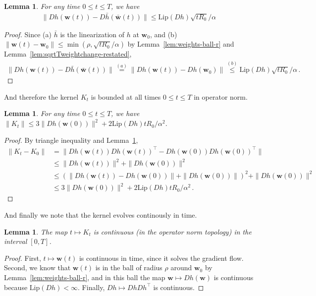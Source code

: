 \documentclass[11pt]{article} %
\newcommand{\<}{\langle}
\renewcommand{\>}{\rangle}
\def\bw{{\boldsymbol w}}
\def\barbw{\bar{\bw}}
\newcommand{\Lip}{\mathrm{Lip}}
\theoremstyle{plain}
\newtheorem{lemma}[theorem]{Lemma}
\theoremstyle{definition}
\theoremstyle{remark}
\begin{document}
\begin{lemma}\label{lem:Dhclose}
For any time $0 \leq t \leq T$, we have
\begin{align*}
\|Dh(\bw(t)) - D\bar{h}(\barbw(t))\| \leq \Lip(Dh) \sqrt{t R_0} / \alpha
\end{align*}
\end{lemma}
\begin{proof}
Since (a) $\bar{h}$ is the linearization of $h$ at $\bw_0$, and (b) $\|\bw(t) - \bw_0\| \leq \min(\rho,\sqrt{t R_0} / \alpha)$ by  Lemma~\ref{lem:weights-ball-r} and Lemma~\ref{lem:sqrtTweightchange-restated},
\begin{align*}
\|Dh(\bw(t)) - D\bar{h}(\barbw(t))\| \stackrel{(a)}{=} \|Dh(\bw(t)) - Dh(\bw_0)\| \stackrel{(b)}{\leq} \Lip(Dh) \sqrt{t R_0} / \alpha\,.
\end{align*}
\end{proof}
And therefore the kernel $K_t$ is bounded at all times $0 \leq t \leq T$ in operator norm.
\begin{lemma}\label{lem:Ktbounded}
For any time $0 \leq t \leq T$, we have $\|K_t\| \leq 3\|Dh(\bw(0))\|^2 + 2\Lip(Dh)tR_0 / \alpha^2$.
\end{lemma}
\begin{proof}
By triangle inequality and Lemma~\ref{lem:Dhclose},
\begin{align*}
\|K_t - K_0\| &= \|Dh(\bw(t))Dh(\bw(t))^{\top} - Dh(\bw(0))Dh(\bw(0))^{\top}\| \\
&\leq \|Dh(\bw(t))\|^2 +\|Dh(\bw(0))\|^2 \\
&\leq (\|Dh(\bw(t)) - Dh(\bw(0))\| + \|Dh(\bw(0))\|)^2 + \|Dh(\bw(0))\|^2 \\
&\leq 3\|Dh(\bw(0))\|^2 + 2\Lip(Dh)tR_0 / \alpha^2\,.
\end{align*}
\end{proof}

And finally we note that the kernel evolves continously in time.
\begin{lemma}\label{lem:Ktcontinuous}
The map $t \mapsto K_t$ is continuous (in the operator norm topology) in the interval $[0,T]$.
\end{lemma}
\begin{proof}
First, $t \mapsto \bw(t)$ is continuous in time, since it solves the gradient flow. Second, we know that $\bw(t)$ is in the ball of radius $\rho$ around $\bw_0$ by Lemma~\ref{lem:weights-ball-r}, and in this ball the map $\bw \mapsto Dh(\bw)$ is continuous because $\Lip(Dh) < \infty$. Finally, $Dh \mapsto Dh Dh^{\top}$ is continuous.
\end{proof}
\end{document}
